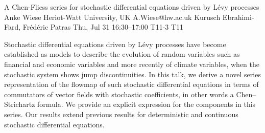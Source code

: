 \begin{talk}
  {A Chen-Fliess series for stochastic differential equations driven by L{\'e}vy processes}%
  {Anke Wiese}%
  {Heriot-Watt University, UK}%
  {A.Wiese@hw.ac.uk}%
  {Kurusch Ebrahimi-Fard, Fr{\'e}d{\'e}ric Patras}%
  {}%
  {Thu, Jul 31 16:30–17:00}%
  {T11-3}%
  {T11}%
  
				

Stochastic differential equations driven by L{\'e}vy processes have become established as models to describe the evolution of random variables such as financial and economic variables and more recently of climate variables, when the stochastic system shows jump discontinuities. In this talk, we derive a novel series representation of the flowmap of such stochastic 
differential equations 
in terms of commutators of vector fields with stochastic 
coefficients, in other words a Chen--Strichartz formula. We provide an explicit expression for the components in this series. 
Our results extend previous results
for deterministic and continuous stochastic differential equations.		
\end{talk}

